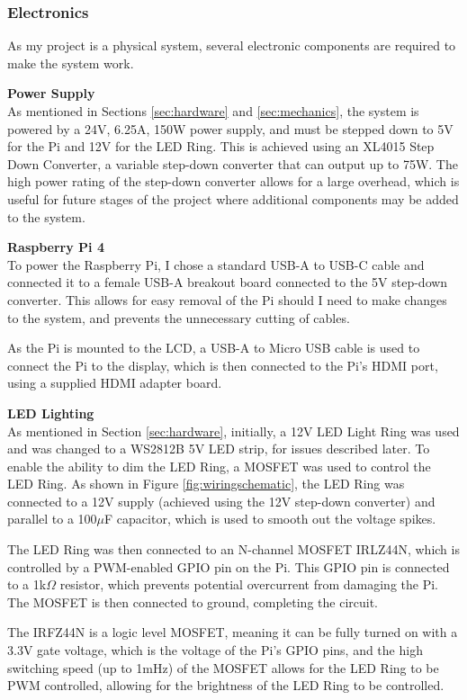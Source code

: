 \subsubsection{Electronics}
As my project is a physical system, several electronic components are required to make the system work.

\noindent
\textbf{Power Supply} \\
As mentioned in Sections \ref*{sec:hardware} and \ref*{sec:mechanics}, the system is powered by a 24V, 6.25A, 150W power supply, and must
be stepped down to 5V for the Pi and 12V for the LED Ring. This is achieved using an XL4015 Step Down Converter\cite{xl4015}, a variable
step-down converter that can output up to 75W.
The high power rating of the step-down converter allows for a large overhead, which is useful for future stages of the project where 
additional components may be added to the system.

\noindent
\textbf{Raspberry Pi 4} \\
To power the Raspberry Pi, I chose a standard USB-A to USB-C cable and connected it to a female USB-A breakout board connected to the
5V step-down converter. This allows for easy removal of the Pi should I need to make changes to the system, and prevents the unnecessary
cutting of cables.

As the Pi is mounted to the LCD, a USB-A to Micro USB cable is used to connect the Pi to the display, which is then connected to the
Pi's HDMI port, using a supplied HDMI adapter board.

\noindent
\textbf{LED Lighting} \\
As mentioned in Section \ref*{sec:hardware}, initially, a 12V LED Light Ring was used and was changed to a WS2812B 5V LED strip, for issues described 
later. To enable the ability to dim the LED Ring, a MOSFET was used to control the LED Ring. As shown in Figure \ref*{fig:wiringschematic}, the LED Ring was connected to a 12V supply (achieved using the 12V step-down converter) and
parallel to a 100$\mu$F capacitor, which is used to smooth out the voltage spikes.

The LED Ring was then connected to an N-channel MOSFET IRLZ44N\cite{irlz44n}, which is controlled by a PWM-enabled GPIO pin on the Pi.
This GPIO pin is connected to a 1k$\Omega$ resistor, which prevents potential overcurrent from damaging the Pi. The MOSFET is then connected to ground, completing the circuit.

The IRFZ44N is a logic level MOSFET, meaning it can be fully turned on with a 3.3V gate voltage, which is the voltage of the Pi's GPIO pins, and the high
switching speed (up to 1mHz) of the MOSFET allows for the LED Ring to be PWM controlled, allowing for the brightness of the LED Ring to be controlled.